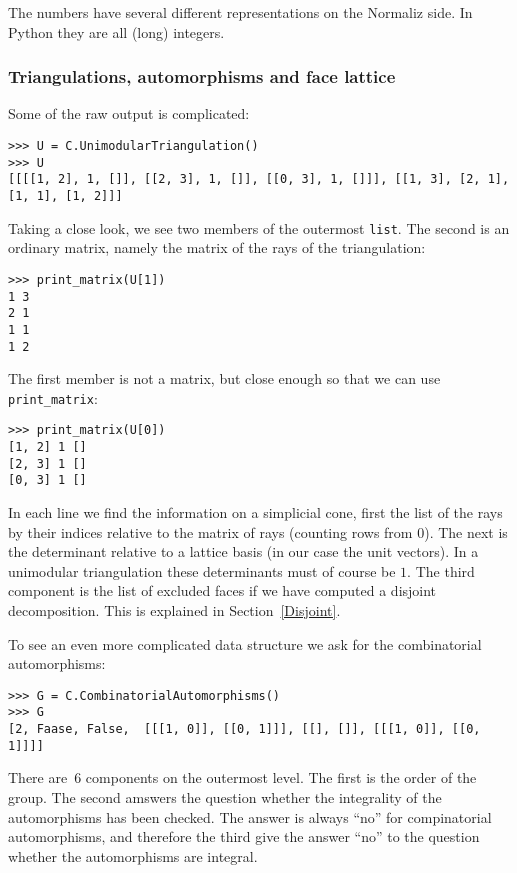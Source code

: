 \begin{small}
The numbers have several different representations on the Normaliz side. In Python they are all (long) integers.
\subsubsection{Triangulations, automorphisms and face lattice}
Some of the raw output is complicated:
\begin{Verbatim}
>>> U = C.UnimodularTriangulation()
>>> U
[[[[1, 2], 1, []], [[2, 3], 1, []], [[0, 3], 1, []]], [[1, 3], [2, 1], [1, 1], [1, 2]]]
\end{Verbatim}
Taking a close look, we see two members of the outermost \verb|list|. The second is an ordinary matrix, namely the matrix of the rays of the triangulation:
\begin{Verbatim}
>>> print_matrix(U[1])
1 3
2 1
1 1
1 2
\end{Verbatim}
The first member is not a matrix, but close enough so that we can use \verb|print_matrix|:
\begin{Verbatim}
>>> print_matrix(U[0])
[1, 2] 1 []
[2, 3] 1 []
[0, 3] 1 []
\end{Verbatim}
In each line we find the information on a simplicial cone, first the list of the rays by their indices relative to the matrix of rays (counting rows from $0$). The next is the determinant relative to a lattice basis (in our case the unit vectors). In a unimodular triangulation these determinants must of course be $1$. The third component is the list of excluded faces if we have computed a disjoint decomposition. This is explained in Section~\ref{Disjoint}.

To see an even more complicated data structure we ask for the combinatorial automorphisms:
\begin{Verbatim}
>>> G = C.CombinatorialAutomorphisms()
>>> G
[2, Faase, False,  [[[1, 0]], [[0, 1]]], [[], []], [[[1, 0]], [[0, 1]]]]
\end{Verbatim}
There are~$6$ components on the outermost level. The first is the order of the group. The second amswers the question whether the integrality of the automorphisms has been checked. The answer is always ``no'' for compinatorial automorphisms, and therefore the third give the answer ``no'' to the question whether the automorphisms are integral.


\end{small}

